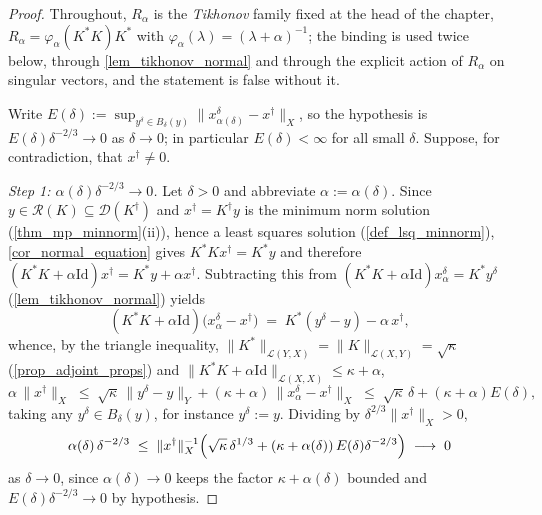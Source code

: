 \documentclass[a4paper]{report}
\theoremstyle{plain}
\theoremstyle{definition}
\theoremstyle{remark}
\newcommand{\Ll}{\mathcal{L}}
\newcommand{\Ran}{\mathcal{R}}
\newcommand{\Dom}{\mathcal{D}}
\newcommand{\Id}{\mathrm{Id}}
\newcommand{\dg}{^{\dagger}}
\begin{document}
\begin{proof}
  Throughout, $R_{\alpha}$ is the \emph{Tikhonov} family fixed at the head of the
  chapter, $R_{\alpha} = \varphi_{\alpha}(K^{*}K)K^{*}$ with $\varphi_{\alpha}(\lambda) =
  (\lambda+\alpha)^{-1}$; the binding is used twice below, through
  \cref{lem_tikhonov_normal} and through the explicit action of $R_{\alpha}$ on singular
  vectors, and the statement is false without it.

  Write $E(\delta) := \sup_{y^{\delta} \in B_{\delta}(y)}\|x^{\delta}_{\alpha(\delta)} -
  x\dg\|_X$, so the hypothesis is $E(\delta)\delta^{-2/3} \to 0$ as $\delta \to 0$; in
  particular $E(\delta) < \infty$ for all small $\delta$.  Suppose, for contradiction,
  that $x\dg \ne 0$.

  \emph{Step 1: $\alpha(\delta)\delta^{-2/3} \to 0$.}  Let $\delta > 0$ and abbreviate
  $\alpha := \alpha(\delta)$.  Since $y \in \Ran(K) \subseteq \Dom(K\dg)$ and $x\dg =
  K\dg y$ is the minimum norm solution (\cref{thm_mp_minnorm}(ii)), hence a least squares
  solution (\cref{def_lsq_minnorm}), \cref{cor_normal_equation} gives $K^{*}Kx\dg =
  K^{*}y$ and therefore $(K^{*}K + \alpha\Id)x\dg = K^{*}y + \alpha x\dg$.  Subtracting
  this from $(K^{*}K + \alpha\Id)x^{\delta}_{\alpha} = K^{*}y^{\delta}$
  (\cref{lem_tikhonov_normal}) yields
  \[
    (K^{*}K + \alpha\Id)\bigl(x^{\delta}_{\alpha} - x\dg\bigr)
      \;=\; K^{*}(y^{\delta} - y) - \alpha\,x\dg ,
  \]
  whence, by the triangle inequality, $\|K^{*}\|_{\Ll(Y,X)} = \|K\|_{\Ll(X,Y)} =
  \sqrt{\kappa}$ (\cref{prop_adjoint_props}) and $\|K^{*}K + \alpha\Id\|_{\Ll(X,X)} \le
  \kappa + \alpha$,
  \[
    \alpha\,\|x\dg\|_X \;\le\; \sqrt{\kappa}\,\|y^{\delta}-y\|_Y
      + (\kappa+\alpha)\,\|x^{\delta}_{\alpha} - x\dg\|_X
      \;\le\; \sqrt{\kappa}\,\delta + (\kappa+\alpha)E(\delta) ,
  \]
  taking any $y^{\delta} \in B_{\delta}(y)$, for instance $y^{\delta} := y$.  Dividing by
  $\delta^{2/3}\|x\dg\|_X > 0$,
  \[
    \alpha(\delta)\,\delta^{-2/3} \;\le\; \|x\dg\|_X^{-1}\Bigl(
      \sqrt{\kappa}\,\delta^{1/3} + (\kappa + \alpha(\delta))\,E(\delta)\delta^{-2/3}
      \Bigr) \;\longrightarrow\; 0
  \]
  as $\delta \to 0$, since $\alpha(\delta) \to 0$ keeps the factor $\kappa+\alpha(\delta)$
  bounded and $E(\delta)\delta^{-2/3} \to 0$ by hypothesis.


\end{proof}
\end{document}
